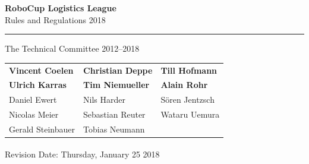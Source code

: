 \documentclass[12pt,twoside]{article}
\begin{document}
\hypersetup{pageanchor=false}


\begin{titlepage}
  \vspace*{5cm}
  \begin{center}
    \begin{LARGE}

      {\bf RoboCup Logistics League}\\[2ex]
      {\Large Rules and Regulations 2018}\\[4ex]
    \end{LARGE}
    \hrule

    {\LARGE\vspace*{4ex}}
    \begin{Large}
      The Technical Committee 2012--2018\\[6ex]
    \end{Large}
    \begin{tabular}{lll}
      \textbf{Vincent Coelen}&\textbf{Christian Deppe}&\textbf{Till Hofmann}\\
      \textbf{Ulrich Karras}&\textbf{Tim Niemueller}&\textbf{Alain Rohr}\\[.5em]

      Daniel Ewert&Nils Harder&S\"oren Jentzsch\\
      Nicolas Meier&Sebastian Reuter&Wataru Uemura\\
      Gerald Steinbauer&Tobias Neumann\\
    \end{tabular}
    \vfill
    Revision Date: Thursday, January 25\textsuperscript{}
    2018
  \end{center}
\end{titlepage}
\thispagestyle{empty}
\pagebreak
\clearpage

\hypersetup{pageanchor=true}
\setcounter{page}{1}
\tableofcontents
\newpage
\cleardoublepage{}

\setcounter{page}{1}

\end{document}
